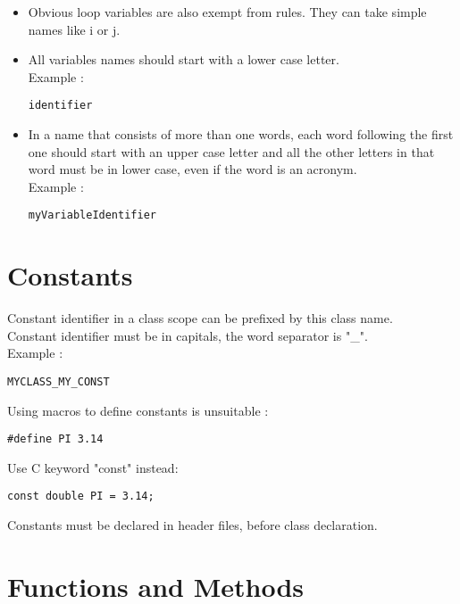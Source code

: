 \documentclass[a4paper,twoside,openright,makeidx,12pt]{report}
\begin{document}
\begin{itemize}
\item Obvious loop variables are also exempt from rules. They can take simple names like i or j. 
\item All variables names should start with a lower case letter.\\
  Example : \begin{verbatim}identifier \end{verbatim}	
\item In a name that consists of more than one words, each word following the first one should start with an upper case letter and all 		the other letters in that word must be in lower case, even if the word is an acronym. \\
  Example : \begin{verbatim}myVariableIdentifier \end{verbatim}
\end{itemize}

\section{Constants}

Constant identifier in a class scope can be prefixed by this class name. \\
Constant identifier must be in capitals, the word separator is "\_". \\
Example : \begin{verbatim}MYCLASS_MY_CONST \end{verbatim}
Using macros to define constants is unsuitable : \begin{verbatim}#define PI 3.14 \end{verbatim}
Use C keyword "const" instead: \begin{verbatim}const double PI = 3.14;\end{verbatim} Constants must be declared in header files, before class declaration.\\

\section{Functions and Methods}
\end{document}
